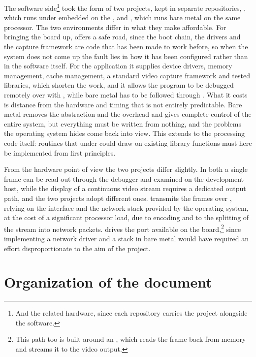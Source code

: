 The software side\footnote{And the related hardware, since each repository carries the  project alongside the software.} took the form of two projects, kept in separate repositories, \cite{FPGALIX-REPO}, which runs under embedded  on the , and \cite{FPGASTEEL-REPO}, which runs bare metal on the same processor. The two environments differ in what they make affordable. For bringing the board up,  offers a safe road, since the boot chain, the drivers and the capture framework are code that has been made to work before, so when the system does not come up the fault lies in how it has been configured rather than in the software itself. For the application it supplies device drivers, memory management, cache management, a standard video capture framework and tested libraries, which shorten the work, and it allows the program to be debugged remotely over  with , while bare metal has to be followed through . What it costs is distance from the hardware and timing that is not entirely predictable. Bare metal removes the abstraction and the overhead and gives complete control of the entire system, but everything must be written from nothing, and the problems the operating system hides come back into view. This extends to the processing code itself: routines that under  could draw on existing library functions must here be implemented from first principles.

From the hardware point of view the two projects differ slightly. In both a single frame can be read out through the debugger and examined on the development host, while the display of a continuous video stream requires a dedicated output path, and the two projects adopt different ones.  transmits the frames over , relying on the interface and the network stack provided by the operating system, at the cost of a significant processor load, due to encoding and to the splitting of the stream into network packets.  drives the  port available on the board,\footnote{This path too is built around an , which reads the frame back from memory and streams it to the video output.} since implementing a network driver and a  stack in bare metal would have required an effort disproportionate to the aim of the project.

\section{Organization of the document}

